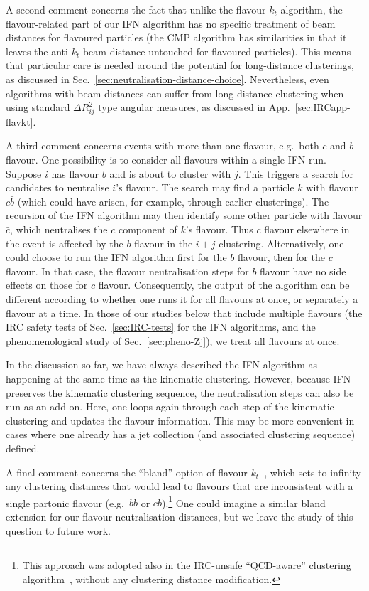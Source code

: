 \documentclass[nofootinbib,twocolumn,preprintnumbers,superscriptaddress,aps]{revtex4-2}
\begin{document}
A second comment concerns the fact that unlike the flavour-$k_t$
algorithm, the flavour-related part of our IFN algorithm has no
specific treatment of beam distances for flavoured particles
(the CMP algorithm has similarities in that it leaves the anti-$k_t$
beam-distance untouched for flavoured particles).
%
This means that particular care is needed around the potential for
long-distance clusterings, as discussed in
Sec.~\ref{sec:neutralisation-distance-choice}.
%
Nevertheless, even algorithms with beam distances can suffer from long
distance clustering when using standard $\Delta R_{ij}^2$ type angular
measures, as discussed in App.~\ref{sec:IRCapp-flavkt}. 

A third comment concerns events with more than one flavour, e.g.\ both
$c$ and $b$ flavour.
%
One possibility is to consider all flavours within a single IFN run.
%
Suppose $i$ has flavour $b$ and is about to cluster with $j$.
%
This triggers a search for candidates to neutralise $i$'s flavour.
%
The search may find a particle $k$ with flavour $c\bar b$ (which could
have arisen, for example, through earlier clusterings).
%
The recursion of the IFN algorithm may then identify some other
particle with flavour $\bar c$, which neutralises the $c$ component of
$k$'s flavour.
%
Thus $c$ flavour elsewhere in the event is affected by the $b$ flavour
in the $i+j$ clustering.
%
Alternatively, one could choose to run the IFN algorithm first for the
$b$ flavour, then for the $c$ flavour.
%
In that case, the flavour neutralisation steps for $b$ flavour have no
side effects on those for $c$ flavour.
% 
Consequently, the output of the algorithm can be different according to
whether one runs it for all flavours at once, or separately a flavour
at a time.
%
In those of our studies below that include multiple flavours (the IRC
safety tests of Sec.~\ref{sec:IRC-tests} for the IFN algorithms,
and the phenomenological study of Sec.~\ref{sec:pheno-Zj}), we
treat all flavours at once.

In the discussion so far, we have always described the IFN algorithm as
happening at the same time as the kinematic clustering.
%
However, because IFN preserves the kinematic clustering sequence, the
neutralisation steps can also be run as an add-on.
%
Here, one loops again through each step of the kinematic clustering
and updates the flavour information.
%
This may be more convenient in cases where one already has a jet
collection (and associated clustering sequence) defined.


A final comment concerns the ``bland'' option of
flavour-$k_t$~\cite{Banfi:2006hf}, which sets to infinity any
clustering distances that would lead to flavours that are inconsistent
with a single partonic flavour (e.g.\ $bb$ or $\bar c b$).\footnote{
  This approach was adopted also in the IRC-unsafe ``QCD-aware''
  clustering algorithm~\cite{Buckley:2015gua}, without any clustering
  distance modification.  }
%
One could imagine a similar bland extension for our flavour
neutralisation distances, but we leave the study of this question to
future work.
\end{document}
